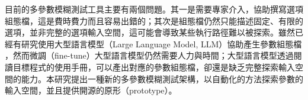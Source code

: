 目前的多參數模糊測試工具主要有兩個問題。其一是需要專家介入，協助撰寫選項組態檔，這是費時費力而且容易出錯的；其次是組態檔仍然只能描述固定、有限的選項，並非完整的選項輸入空間，這可能會導致某些執行路徑難以被探索。雖然已經有研究使用大型語言模型（Large Language Model, LLM）協助產生參數組態檔 \cite{tsai2024Multiple}，然而微調（fine-tune）大型語言模型仍然需要人力與時間；大型語言模型透過閱讀目標程式的使用手冊，可以產出對應的參數組態檔，卻還是缺乏完整探索輸入空間的能力。本研究提出一種新的多參數模糊測試架構，以自動化的方法探索參數的輸入空間，並且提供開源的原形（prototype）。